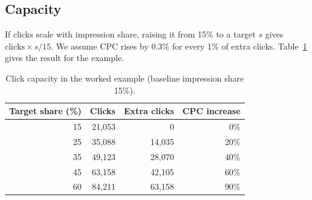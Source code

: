 \documentclass[10pt,a4paper]{article}
\begin{document}
\subsection{Capacity}
If clicks scale with impression share, raising it from 15\% to a target $s$ gives $\text{clicks}\times s/15$. We assume CPC rises by $0.3\%$ for every 1\% of extra clicks. Table~\ref{tab:cap} gives the result for the example.
\begin{table}[H]\centering\small\caption{Click capacity in the worked example (baseline impression share 15\%).}\label{tab:cap}
\begin{tabular}{rrrr}\toprule Target share (\%) & Clicks & Extra clicks & CPC increase\\\midrule
15 & 21,053 & 0 & 0\%\\
25 & 35,088 & 14,035 & 20\%\\
35 & 49,123 & 28,070 & 40\%\\
45 & 63,158 & 42,105 & 60\%\\
60 & 84,211 & 63,158 & 90\%\\
\bottomrule\end{tabular}\end{table}
\end{document}
